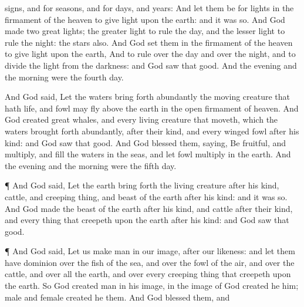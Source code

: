 {signs, and for
seasons, and for
days, and
years:
And let them be for
lights in the
firmament of the
heaven to give
light upon the
earth: and it was so.
And
God
made
two
great
lights; the
greater
light to
rule the
day, and the
lesser
light to
rule the
night:
{} the
stars also.
And
God
set them in the
firmament of the
heaven to give
light upon the
earth,
And to
rule over the
day and over the
night, and to
divide the
light from the
darkness: and
God
saw that
{}
good.
And the
evening and the
morning were the
fourth
day.
\par }{\PP {}And
God
said, Let the
waters bring forth
abundantly the moving
creature that
hath
life, and
fowl
{} may
fly
above the
earth in the
open
firmament of
heaven.
And
God
created
great
whales, and every
living
creature that
moveth, which the
waters brought forth
abundantly, after their
kind, and every
winged
fowl after his
kind: and
God
saw that
{}
good.
And
God
blessed them,
saying, Be
fruitful, and
multiply, and
fill the
waters in the
seas, and let
fowl
multiply in the
earth.
And the
evening and the
morning were the
fifth
day.
\par }{\PP {}¶ And
God
said, Let the
earth bring
forth the
living
creature after his
kind,
cattle, and creeping
thing, and
beast of the
earth after his
kind: and it was so.
And
God
made the
beast of the
earth after his
kind, and
cattle after their
kind, and every thing that
creepeth upon the
earth after his
kind: and
God
saw that
{}
good.
\par }{\PP {}¶ And
God
said, Let us
make
man in our
image, after our
likeness: and let them have
dominion over the
fish of the
sea, and over the
fowl of the
air, and over the
cattle, and over all the
earth, and over every creeping
thing that
creepeth upon the
earth.
So
God
created
man in his
{}
image, in the
image of
God
created he him;
male and
female
created he them.
And
God
blessed them, and
}
